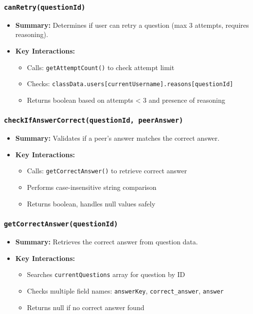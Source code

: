\documentclass[11pt,letterpaper]{article}
\begin{document}
\subsubsection{\texttt{canRetry(questionId)}}
\begin{itemize}
    \item \textbf{Summary:} Determines if user can retry a question (max 3 attempts, requires reasoning).
    \item \textbf{Key Interactions:}
    \begin{itemize}
        \item Calls: \texttt{getAttemptCount()} to check attempt limit
        \item Checks: \texttt{classData.users[currentUsername].reasons[questionId]}
        \item Returns boolean based on attempts < 3 and presence of reasoning
    \end{itemize}
\end{itemize}

\subsubsection{\texttt{checkIfAnswerCorrect(questionId, peerAnswer)}}
\begin{itemize}
    \item \textbf{Summary:} Validates if a peer's answer matches the correct answer.
    \item \textbf{Key Interactions:}
    \begin{itemize}
        \item Calls: \texttt{getCorrectAnswer()} to retrieve correct answer
        \item Performs case-insensitive string comparison
        \item Returns boolean, handles null values safely
    \end{itemize}
\end{itemize}

\subsubsection{\texttt{getCorrectAnswer(questionId)}}
\begin{itemize}
    \item \textbf{Summary:} Retrieves the correct answer from question data.
    \item \textbf{Key Interactions:}
    \begin{itemize}
        \item Searches \texttt{currentQuestions} array for question by ID
        \item Checks multiple field names: \texttt{answerKey}, \texttt{correct\_answer}, \texttt{answer}
        \item Returns null if no correct answer found
    \end{itemize}
\end{itemize}
\end{document}
